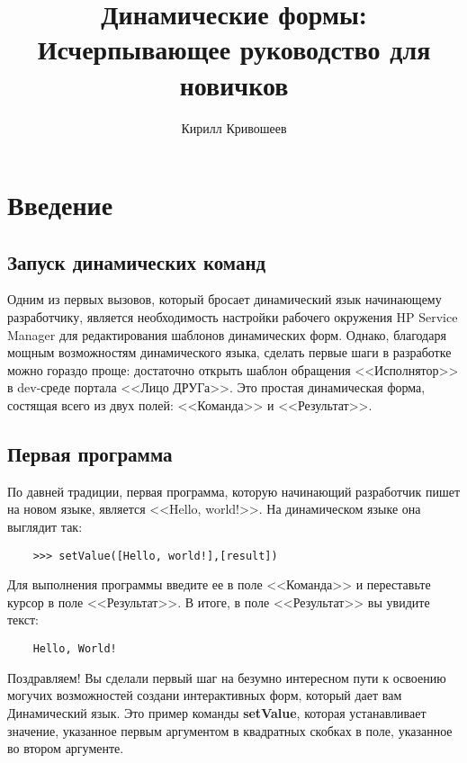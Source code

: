 \documentclass[10pt]{book}
\begin{document}
	\title{Динамические формы: Исчерпывающее руководство для новичков}
	\author{Кирилл Кривошеев}
	\frontmatter
	\maketitle
	\tableofcontents
	\mainmatter
	
	\chapter{Введение}
	
	\section{Запуск динамических команд}
	Одним из первых вызовов, который бросает динамический язык начинающему разработчику, является необходимость настройки рабочего окружения HP Service Manager для редактирования шаблонов динамических форм. Однако, благодаря мощным возможностям динамического языка, сделать первые шаги в разработке можно гораздо проще: достаточно открыть шаблон обращения <<Исполнятор>> в dev-среде портала <<Лицо ДРУГа>>. Это простая динамическая форма, состящая всего из двух полей: <<Команда>> и <<Результат>>.
	
	\section{Первая программа}
	
	По давней традиции, первая программа, которую начинающий разработчик пишет на новом языке, является <<Hello, world!>>. На динамическом языке она выглядит так:
	\begin{verbatim}
	>>> setValue([Hello, world!],[result])
	\end{verbatim}
	
	Для выполнения программы введите ее в поле <<Команда>> и переставьте курсор в поле <<Результат>>. В итоге, в поле <<Результат>> вы увидите текст:
	
	\begin{verbatim}
	Hello, World!
	\end{verbatim}
	
	Поздравляем! Вы сделали первый шаг на безумно интересном пути к освоению могучих возможностей создани интерактивных форм, который дает вам Динамический язык.
	Это пример команды {\bf setValue}, которая устанавливает значение, указанное первым аргументом в квадратных скобках в поле, указанное во втором аргументе.
	
\end{document}
